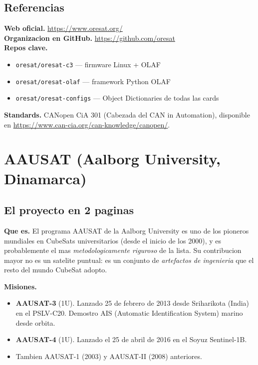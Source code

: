\documentclass[11pt,a4paper,oneside,openright]{book}
\begin{document}
\section{Referencias}

\begin{payloadbox}
\textbf{Web oficial.} \url{https://www.oresat.org/}\\[0.3em]
\textbf{Organizacion en GitHub.} \url{https://github.com/oresat}\\[0.3em]
\textbf{Repos clave.}
\begin{itemize}[leftmargin=2em]
  \item \texttt{oresat/oresat-c3} --- firmware Linux + OLAF
  \item \texttt{oresat/oresat-olaf} --- framework Python OLAF
  \item \texttt{oresat/oresat-configs} --- Object Dictionaries
    de todas las cards
\end{itemize}
\textbf{Standards.} CANopen CiA 301 (Cabezada del CAN in Automation),
disponible en \url{https://www.can-cia.org/can-knowledge/canopen/}.
\end{payloadbox}

\chapter{AAUSAT (Aalborg University, Dinamarca)}

\section{El proyecto en 2 paginas}

\textbf{Que es.} El programa AAUSAT de la Aalborg University es uno
de los pioneros mundiales en CubeSats universitarios (desde el inicio
de los 2000), y es probablemente el mas \emph{metodologicamente
riguroso} de la lista. Su contribucion mayor no es un satelite
puntual: es un conjunto de \emph{artefactos de ingenieria} que el
resto del mundo CubeSat adopto.

\textbf{Misiones.}
\begin{itemize}[leftmargin=2em]
  \item \textbf{AAUSAT-3} (1U). Lanzado 25 de febrero de 2013 desde
    Sriharikota (India) en el PSLV-C20. Demostro AIS (Automatic
    Identification System) marino desde orbita.
  \item \textbf{AAUSAT-4} (1U). Lanzado el 25 de abril de 2016 en
    el Soyuz Sentinel-1B.
  \item Tambien AAUSAT-1 (2003) y AAUSAT-II (2008) anteriores.
\end{itemize}
\end{document}

